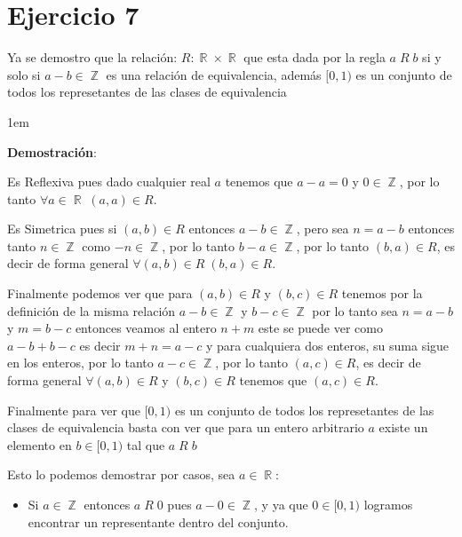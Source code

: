 \documentclass[12pt, fleqn]{article}                             %
\newenvironment{SmallIndentation}[1][0.75em]                    %
    {\begin{adjustwidth}{#1}{}\begin{footnotesize}}                 %
    {\end{footnotesize}\end{adjustwidth}}                           %
\DeclareMathOperator \Integers  {\mathbb{Z}}                     %
\DeclareMathOperator \Reals     {\mathbb{R}}                     %
\begin{document}
\clearpage
\section{Ejercicio 7}

    Ya se demostro que la relación: $R: \Reals \times \Reals$ que esta dada por la regla
    $a \; R \; b$ si y solo si $a-b \in \Integers$ es una relación de equivalencia, además
    $[0,1)$ es un conjunto de todos los represetantes de las clases de equivalencia

    \begin{SmallIndentation}[1em]
        \textbf{Demostración}:
        
        Es Reflexiva pues dado cualquier real $a$ tenemos que $a-a=0$ y $0 \in \Integers$, por lo tanto
        $\forall a \in \Reals \; (a, a) \in R$.

        Es Simetrica pues si $(a,b) \in R$ entonces $a-b \in \Integers$, pero sea $n = a-b$ entonces tanto
        $n \in \Integers$ como $-n \in \Integers$, por lo tanto $b-a \in \Integers$, por lo tanto
        $(b, a) \in R$, es decir de forma general $\forall (a,b) \in R \; (b,a) \in R$. 
    

        Finalmente podemos ver que para $(a,b) \in R$ y $(b,c) \in R$ tenemos por la definición de 
        la misma relación $a-b \in \Integers$ y $b-c \in \Integers$ por lo tanto sea $n=a-b$ y $m=b-c$
        entonces veamos al entero $n+m$ este se puede ver como $a-b+b-c$ es decir $m+n=a-c$ y para cualquiera
        dos enteros, su suma sigue en los enteros, por lo tanto $a-c \in \Integers$, por lo tanto
        $(a,c) \in R$, es decir de forma general $\forall (a,b) \in R$ y $(b,c) \in R$ tenemos que $(a,c) \in R$. 

        Finalmente para ver que $[0,1)$ es un conjunto de todos los represetantes de las clases de equivalencia
        basta con ver que para un entero arbitrario $a$ existe un elemento en $b \in [0,1)$ tal que $a \; R \; b$

        Esto lo podemos demostrar por casos, sea $a \in \Reals$:
        \begin{itemize}

            \item
                Si $a \in \Integers$ entonces $a \; R \; 0$ pues $a-0 \in \Integers$, y ya que $0 \in [0,1)$
                logramos encontrar un representante dentro del conjunto.


\end{itemize}
\end{SmallIndentation}
\end{document}
